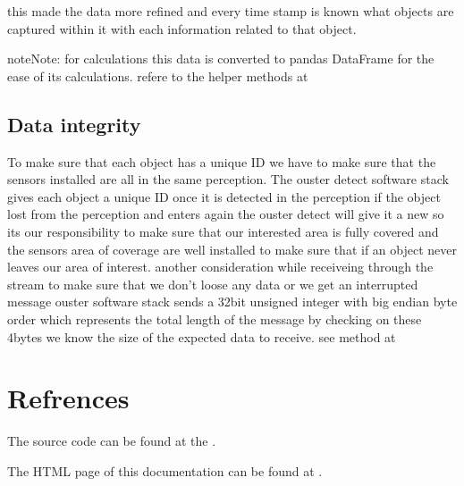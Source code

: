\documentclass[letterpaper,10pt,english]{sphinxmanual}
\begin{document}
\sphinxAtStartPar
this made the data more refined and every time stamp is known what objects are captured within it with each information related to that object.

\begin{sphinxadmonition}{note}{Note:}
\sphinxAtStartPar
for calculations this data is converted to pandas DataFrame for the ease of its calculations. refere to the helper methods at {\hyperref[\detokenize{processing:processing-utils-ref}]{}}
\end{sphinxadmonition}


\section{Data integrity}
\label{\detokenize{projectdoc:data-integrity}}
\sphinxAtStartPar
To make sure that each object has a unique ID we have to make sure that the sensors installed are all in the same perception.
The ouster detect software stack gives each object a unique ID  once it is detected in the perception if the object lost from the perception and enters again
the ouster detect will give it a new  so its our responsibility to make sure that our interested area is fully covered and the sensors area of coverage are well
installed to make sure that if an object never leaves our area of interest. another consideration while receiveing through the stream to make sure that we don’t loose any
data or we get an interrupted message ouster software stack sends a 32\sphinxhyphen{}bit unsigned integer with big endian byte order which represents the total length of the message
by checking on these 4\sphinxhyphen{}bytes we know the size of the expected data to receive. see  method at {\hyperref[\detokenize{processing:processing-data-ref}]{}}


\chapter{Refrences}
\label{\detokenize{projectdoc:refrences}}
\sphinxAtStartPar
The source code can be found at the  .

\sphinxAtStartPar
The HTML page of this documentation can be found at .
\end{document}
